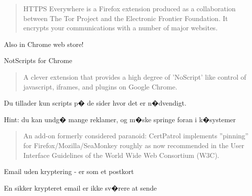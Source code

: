 \documentclass[20pt,landscape,a4paper,footrule]{foils}
\begin{document}

\begin{quote}
HTTPS Everywhere is a Firefox extension produced as a collaboration between The Tor Project and the Electronic Frontier Foundation. It encrypts your communications with a number of major websites.
\end{quote}

\centerline{}


Also in Chrome web store!



NotScripts for Chrome
\begin{quote}
A clever extension that provides a high degree of 'NoScript' like control of javascript, iframes, and plugins on Google Chrome.
\end{quote}

Du tillader kun scripts p� de sider hvor det er n�dvendigt.

Hint: du kan undg� mange reklamer, og m�ske springe foran i k�systemer \smiley





\begin{quote}
An add-on formerly considered paranoid: CertPatrol implements ''pinning'' for Firefox/Mozilla/SeaMonkey roughly as now recommended in the User Interface Guidelines of the World Wide Web Consortium (W3C).
\end{quote}

\centerline{}





\centerline{Email uden kryptering - er som et postkort}






\centerline{En sikker krypteret email er ikke sv�rere at sende}

\end{document}

